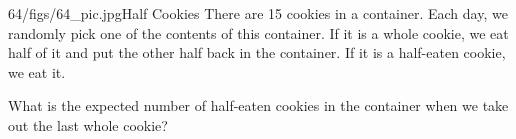 \begin{problem}{64/figs/64_pic.jpg}{Half Cookies} There are 15 cookies in a container. Each day, we randomly pick one of the contents of this container. If it is a whole cookie, we eat half of it and put the other half back in the container. If it is a half-eaten cookie, we eat it.
	
What is the expected number of half-eaten cookies  in the container when we take out the last whole cookie?
\end{problem}